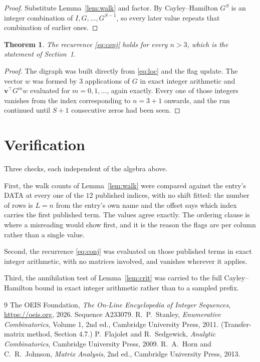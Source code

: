 \documentclass[11pt,a4paper]{article}
\theoremstyle{plain}
\newtheorem{theorem}{Theorem}
\theoremstyle{definition}
\begin{document}
\begin{proof}
Substitute Lemma~\ref{lem:walk} and factor. By Cayley--Hamilton $G^{S}$ is an integer
combination of $I,G,\dots,G^{S-1}$, so every later value repeats that combination of earlier
ones.
\end{proof}

\begin{theorem}
The recurrence \eqref{eq:conj} holds for every $n>3$, which is the statement of
Section~1.
\end{theorem}

\begin{proof}
The digraph was built directly from \eqref{eq:loc} and the flag update. The vector $w$ was
formed by $3$ applications of $G$ in exact integer arithmetic and
$\mathbf{v}^{\!\top}G^{m}w$ evaluated for $m=0,1,\dots$, again exactly. Every one of
those integers vanishes from the index corresponding to $n=3+1$ onwards, and the run
continued until $S+1$ consecutive zeros had been seen.
\end{proof}

\section{Verification}

Three checks, each independent of the algebra above.

First, the walk counts of Lemma~\ref{lem:walk} were compared against the entry's DATA at
every one of the $12$ published indices, with no shift fitted: the number of rows is
$L=n$ from the entry's own name and the offset says which index carries the first
published term. The values agree exactly. The ordering clause is where a misreading would
show first, and it is the reason the flags are per column rather than a single value.

Second, the recurrence \eqref{eq:conj} was evaluated on those published terms in exact
integer arithmetic, with no matrices involved, and vanishes wherever it applies.

Third, the annihilation test of Lemma~\ref{lem:crit} was carried to the full
Cayley--Hamilton bound in exact integer arithmetic rather than to a sampled prefix.

\begin{thebibliography}{9}
 The OEIS Foundation, \emph{The On-Line Encyclopedia of Integer
Sequences}, \url{https://oeis.org}, 2026. Sequence A233079.
 R.~P.~Stanley, \emph{Enumerative Combinatorics}, Volume 1, 2nd ed.,
Cambridge University Press, 2011. (Transfer-matrix method, Section 4.7.)
 P.~Flajolet and R.~Sedgewick, \emph{Analytic Combinatorics}, Cambridge
University Press, 2009.
 R.~A.~Horn and C.~R.~Johnson, \emph{Matrix Analysis}, 2nd ed., Cambridge
University Press, 2013.
\end{thebibliography}
\end{document}
